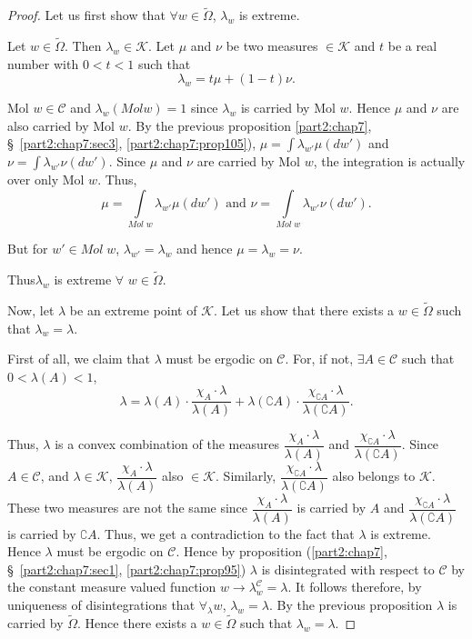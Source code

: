 \begin{proof}
Let us first show that $\forall w \in \tilde{\Omega}$, $\lambda_w$ is
extreme.

Let $w \in\tilde{\Omega}$. Then $\lambda_w\in \mathscr{K}$. Let $\mu$
and $\nu$ be two measures $\in \mathscr{K}$ and $t$ be a real number
with $0 < t < 1 $  such that 
$$
\lambda_w = t \mu + (1-t) \nu .
$$

 Mol  $w \in \mathscr{C}$ and $\lambda_w (Mol w) =1$ since $\lambda_w$
 is carried by Mol $w$. Hence $\mu$ and $\nu$ are also carried by Mol
 $w$. By the previous proposition \ref{part2:chap7},
 \S\ \ref{part2:chap7:sec3}, \ref{part2:chap7:prop105}), $\mu = \int 
 \lambda_{w'} \mu (dw')$ and $\nu = \int \lambda_{w'} \nu(dw')$.
 Since $\mu$ and $\nu$ are carried by Mol $w$, the integration is
 actually over only Mol $w$. Thus, 
$$ 
\mu = \int\limits_{Mol\; w} \lambda_{w'} \mu (dw') \text{ and } \nu =
\int\limits_{Mol \; w} \lambda_{w'} \nu (dw').
$$

But for $w' \in Mol \; w$, $\lambda_{w'} = \lambda_w$ and hence $\mu =
\lambda_w = \nu$. 

Thus\pageoriginale $\lambda_w$ is extreme $\forall $ $w \in
\tilde{\Omega}$. 

Now, let $\lambda$ be an extreme point of $\mathscr{K}$. Let us show
that there exists a $w \in \tilde{\Omega}$ such that $\lambda_w  =
\lambda$. 

First of all, we claim that $\lambda$ must be ergodic on
$\mathscr{C}$. For, if not, $\exists A \in \mathscr{C}$ such that $0 <
\lambda (A) < 1$, 
$$
\lambda = \lambda (A) \cdot \frac{\chi_A \cdot \lambda}{\lambda(A)} +
\lambda (\complement A) \cdot \frac{\chi_{\complement A} \cdot
  \lambda}{\lambda(\complement A )}. 
$$

Thus, $\lambda$ is a convex combination of the measures $\dfrac{\chi_A
\cdot \lambda}{\lambda(A)}$ and $\dfrac{\chi_{\complement A} \cdot
  \lambda}{\lambda(\complement A)}$. Since $A \in \mathscr{C}$, and
$\lambda \in \mathscr{K}$, $\dfrac{\chi_A \cdot \lambda}{\lambda(A)}$
also $\in \mathscr{K}$. Similarly, $\dfrac{\chi_{\complement A} \cdot
  \lambda}{ \lambda (\complement A)}$ also belongs to
$\mathscr{K}$. These two measures are not the same since
$\dfrac{\chi_A \cdot \lambda}{\lambda(A)}$ is carried by $A$ and
$\dfrac{\chi_{\complement A} \cdot \lambda}{\lambda(\complement A)}$
is carried by $\complement A$. Thus, we get a contradiction to the
fact that $\lambda$ is extreme. Hence $\lambda$ must be ergodic on
$\mathscr{C}$. Hence by proposition (\ref{part2:chap7},
\S\ \ref{part2:chap7:sec1}, \ref{part2:chap7:prop95}) $\lambda$ is 
disintegrated with respect to $\mathscr{C}$ by the constant measure
valued function $w \to \lambda^\mathscr{C}_w  = \lambda$. It follows
therefore, by uniqueness of disintegrations that $\forall_\lambda w$,
$\lambda_w = \lambda$. By the previous proposition $\lambda$
is carried by $\tilde{\Omega}$. Hence there exists a $w
\in\tilde{\Omega}$ such that $\lambda_w = \lambda$. 
\end{proof}

